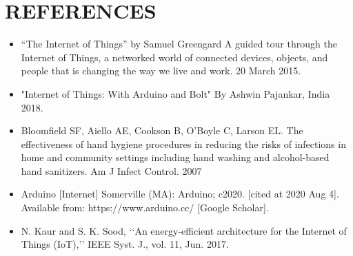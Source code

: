 


\chapter{REFERENCES}

\begin{itemize}
	\item { “The Internet of Things” by Samuel Greengard A guided tour through the Internet of Things, a networked world of connected devices, objects, and people that is changing the way we live and work. 20 March 2015.}
	\item { "Internet of Things: With Arduino and Bolt" By Ashwin Pajankar, India 2018.}
	\item { Bloomfield SF, Aiello AE, Cookson B, O’Boyle C, Larson EL. The effectiveness of hand hygiene procedures in reducing the risks of infections in home and community settings including hand washing and alcohol-based hand sanitizers. Am J Infect Control. 2007}
	\item { Arduino [Internet] Somerville (MA): Arduino; c2020. [cited at 2020 Aug 4]. Available from: https://www.arduino.cc/ [Google Scholar].}
	\item { N. Kaur and S. K. Sood, ‘‘An energy-efficient architecture for the Internet of Things (IoT),’’ IEEE Syst. J., vol. 11, Jun. 2017.
}
	
\end{itemize}


